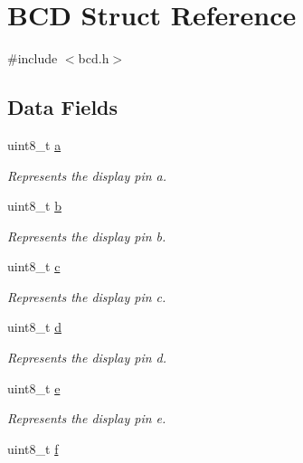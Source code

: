 \hypertarget{structBCD}{}\section{B\+CD Struct Reference}
\label{structBCD}


{\ttfamily \#include $<$bcd.\+h$>$}

\subsection*{Data Fields}
\begin{DoxyCompactItemize}
\item 
uint8\+\_\+t \mbox{\hyperlink{structBCD_a47f4ac66f533a80b7ad832c36189eef9}{a}}
\begin{DoxyCompactList}\small\item\em Represents the display pin \textquotesingle{}a\textquotesingle{}. \end{DoxyCompactList}\item 
uint8\+\_\+t \mbox{\hyperlink{structBCD_ad0a5d9e51ea7e8cc105a6d02cec8b60b}{b}}
\begin{DoxyCompactList}\small\item\em Represents the display pin \textquotesingle{}b\textquotesingle{}. \end{DoxyCompactList}\item 
uint8\+\_\+t \mbox{\hyperlink{structBCD_a888d1510f4c5b6cf0957d3794cdf1941}{c}}
\begin{DoxyCompactList}\small\item\em Represents the display pin \textquotesingle{}c\textquotesingle{}. \end{DoxyCompactList}\item 
uint8\+\_\+t \mbox{\hyperlink{structBCD_ac2e48667814cb2c29e02019592e7368f}{d}}
\begin{DoxyCompactList}\small\item\em Represents the display pin \textquotesingle{}d\textquotesingle{}. \end{DoxyCompactList}\item 
uint8\+\_\+t \mbox{\hyperlink{structBCD_ac48c12d16a3111700c6a67f46db7ea1f}{e}}
\begin{DoxyCompactList}\small\item\em Represents the display pin \textquotesingle{}e\textquotesingle{}. \end{DoxyCompactList}\item 
uint8\+\_\+t \mbox{\hyperlink{structBCD_abd6ad9ecd210b3f8d15a269526534a10}{f}}

\end{DoxyCompactItemize}
